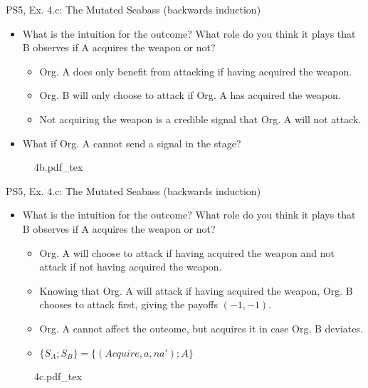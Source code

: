 \begin{frame}{PS5, Ex. 4.c: The Mutated Seabass (backwards induction)}
    \begin{itemize}
      \item[(c)] What is the intuition for the outcome? What role do you think it plays that B observes if A acquires the weapon or not?
      \begin{itemize}\normalsize
        \item[\nth{3} stage:] Org. A does only benefit from attacking if having acquired the weapon.
        \item[\nth{2} stage:] Org. B will only choose to attack if Org. A has acquired the weapon.
        \item[\nth{1} stage:] Not acquiring the weapon is a credible signal that Org. A will not attack.
      \end{itemize}
      \item[] What if Org. A cannot send a signal in the  stage?
    \end{itemize}
    \vspace{-8pt}
    \begin{figure}[!h]
      \center
      \def\svgwidth{\columnwidth}
      {4b.pdf_tex}
    \end{figure}
    \vfill\null
  \vfill\null
\end{frame}
\begin{frame}{PS5, Ex. 4.c: The Mutated Seabass (backwards induction)}
    \begin{itemize}
      \item[(c)] What is the intuition for the outcome? What role do you think it plays that B observes if A acquires the weapon or not?
      \begin{itemize}\normalsize
        \item[\nth{3} stage:] [unchanged] Org. A will choose to attack if having acquired the weapon and not attack if not having acquired the weapon.
        \item[\nth{2} stage:] Knowing that Org. A will attack if having acquired the weapon, Org. B chooses to attack first, giving the payoffs $(-1,-1)$.
        \item[\nth{1} stage:] Org. A cannot affect the outcome, but acquires it in case Org. B deviates.
        \item[SPNE:] $\{S_A;S_B\}=\{ (Acquire, a, na');A \}$
      \end{itemize}
    \end{itemize}
    \vspace{-10pt}
    \begin{figure}[!h]
      \center
      \def\svgwidth{\columnwidth}
      {4c.pdf_tex}
    \end{figure}
    \vfill\null
  \vfill\null
\end{frame}


